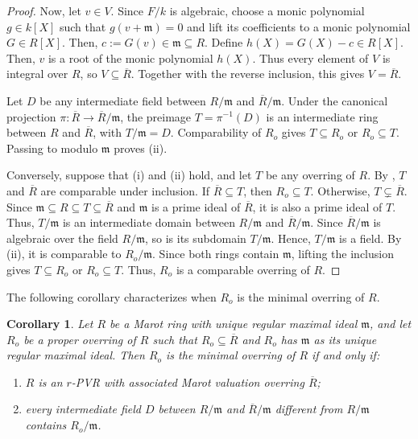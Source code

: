 \documentclass[12pt]{article}
\newtheorem{corollary}{Corollary}
\begin{document}
\begin{proof}
		Now, let $v\in V$. Since $F/k$ is algebraic, choose a monic polynomial $g\in k[X]$ such that $g(v+\mathfrak{m})=0$ and lift its coefficients to a monic polynomial $G\in R[X]$. Then, $c:=G(v)\in\mathfrak{m}\subseteq R$. Define $h(X)=G(X)-c\in R[X]$. Then, $v$ is a root of the monic polynomial $h(X)$. Thus every element of $V$ is integral over $R$, so $V\subseteq\overline R$. Together with the reverse inclusion, this gives $V=\overline R$.
		
		Let $D$ be any intermediate field between $R/\mathfrak{m}$ and $\overline R/\mathfrak{m}$. Under the canonical projection $\pi:\overline R\to\overline R/\mathfrak{m}$, the preimage $T=\pi^{-1}(D)$ is an intermediate ring between $R$ and $\overline R$, with $T/\mathfrak{m}=D$. Comparability of $R_o$ gives $T\subseteq R_o$ or $R_o\subseteq T$. Passing to modulo $\mathfrak{m}$ proves (ii).
		
		Conversely, suppose that (i) and (ii) hold, and let $T$ be any overring of $R$. By \cite[Theorem 3.1]{marot}, $T$ and $\overline R$ are comparable under inclusion. If $\overline R\subseteq T$, then $R_o\subseteq T$. Otherwise, $T\subsetneq\overline R$. Since $\mathfrak{m}\subseteq R\subseteq T\subseteq\overline R$ and $\mathfrak{m}$ is a prime ideal of $\overline R$, it is also a prime ideal of $T$. Thus, $T/\mathfrak{m}$ is an intermediate domain between $R/\mathfrak{m}$ and $\overline R/\mathfrak{m}$. Since $\overline R/\mathfrak m$ is algebraic over the field $R/\mathfrak m$, so is its subdomain $T/\mathfrak m$. Hence, $T/\mathfrak m$ is a field. By (ii), it is comparable to $R_o/\mathfrak{m}$. Since both rings contain $\mathfrak{m}$, lifting the inclusion gives $T\subseteq R_o$ or $R_o\subseteq T$. Thus, $R_o$ is a comparable overring of $R$.
	\end{proof}

The following corollary characterizes when $R_o$ is the minimal overring of $R$.

	\begin{corollary}\label{minimal-same-maximal}
		Let $R$ be a Marot ring with unique regular maximal ideal $\mathfrak{m}$, and let $R_o$ be a proper overring of $R$ such that $R_o\subseteq\overline R$ and $R_o$ has $\mathfrak{m}$ as its unique regular maximal ideal. Then $R_o$ is the minimal overring of $R$ if and only if:
		\begin{enumerate}[label=(\roman*)]
			\item $R$ is an $r$-PVR with associated Marot valuation overring $\overline R$;
			\item every intermediate field $D$ between $R/\mathfrak{m}$ and $\overline R/\mathfrak{m}$ different from $R/\mathfrak{m}$ contains $R_o/\mathfrak{m}$.
		\end{enumerate}
	\end{corollary}
\end{document}
